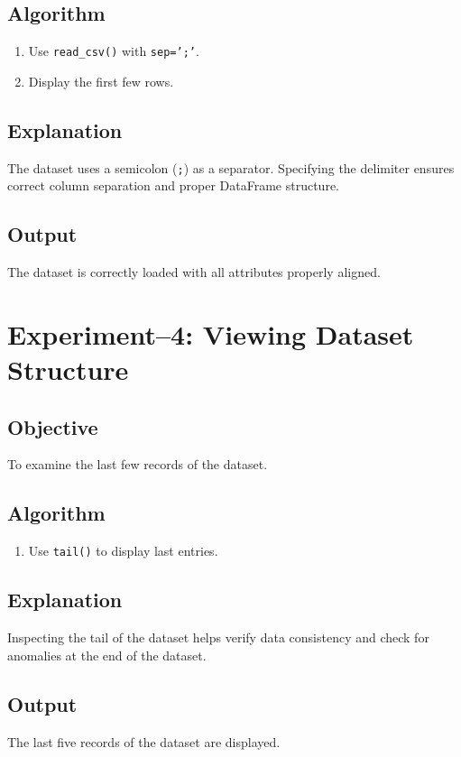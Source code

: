 \documentclass[11pt]{article}
\begin{document}
\subsection*{Algorithm}
\begin{enumerate}
    \item Use \texttt{read\_csv()} with \texttt{sep=';'}.
    \item Display the first few rows.
\end{enumerate}

\subsection*{Explanation}
The dataset uses a semicolon (\texttt{;}) as a separator. Specifying the delimiter ensures correct column separation and proper DataFrame structure.

\subsection*{Output}
The dataset is correctly loaded with all attributes properly aligned.

\section{Experiment--4: Viewing Dataset Structure}

\subsection*{Objective}
To examine the last few records of the dataset.

\subsection*{Algorithm}
\begin{enumerate}
    \item Use \texttt{tail()} to display last entries.
\end{enumerate}

\subsection*{Explanation}
Inspecting the tail of the dataset helps verify data consistency and check for anomalies at the end of the dataset.

\subsection*{Output}
The last five records of the dataset are displayed.
\end{document}
